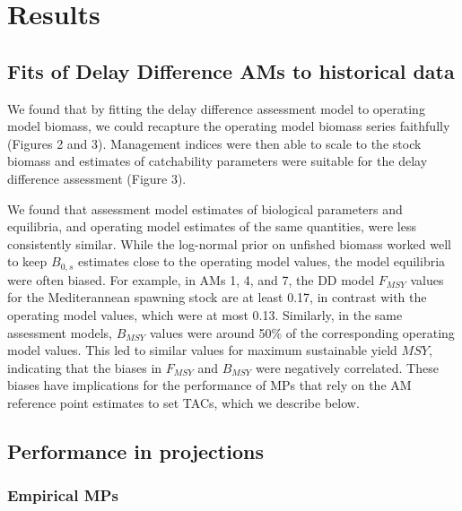 \documentclass[]{article}
\begin{document}
\hypertarget{results}{%
\section{Results}\label{results}}

\hypertarget{fits-of-delay-difference-ams-to-historical-data}{%
\subsection{Fits of Delay Difference AMs to historical data}\label{fits-of-delay-difference-ams-to-historical-data}}

We found that by fitting the delay difference assessment model to operating
model biomass, we could recapture the operating model biomass series
faithfully (Figures 2 and 3). Management indices were then able to scale
to the stock biomass and estimates of catchability parameters were suitable
for the delay difference assessment (Figure 3).

We found that assessment model estimates of biological parameters
and equilibria, and operating model estimates of the same quantities, were
less consistently similar. While the log-normal prior on unfished biomass
worked well to keep \(B_{0,s}\) estimates close to the operating model values,
the model equilibria were often biased. For example, in AMs 1, 4, and 7, the
DD model \(F_{MSY}\) values for the Mediterannean spawning stock are at least 0.17,
in contrast with the operating model values, which were at most 0.13. Similarly,
in the same assessment models, \(B_{MSY}\) values were around 50\% of the corresponding
operating model values. This led to similar values for maximum sustainable
yield \(MSY\), indicating that the biases in \(F_{MSY}\) and \(B_{MSY}\) were negatively correlated.
These biases have implications for the performance of MPs that rely on the
AM reference point estimates to set TACs, which we describe below.

\hypertarget{performance-in-projections}{%
\subsection{Performance in projections}\label{performance-in-projections}}

\hypertarget{empirical-mps}{%
\subsubsection{Empirical MPs}\label{empirical-mps}}
\end{document}
